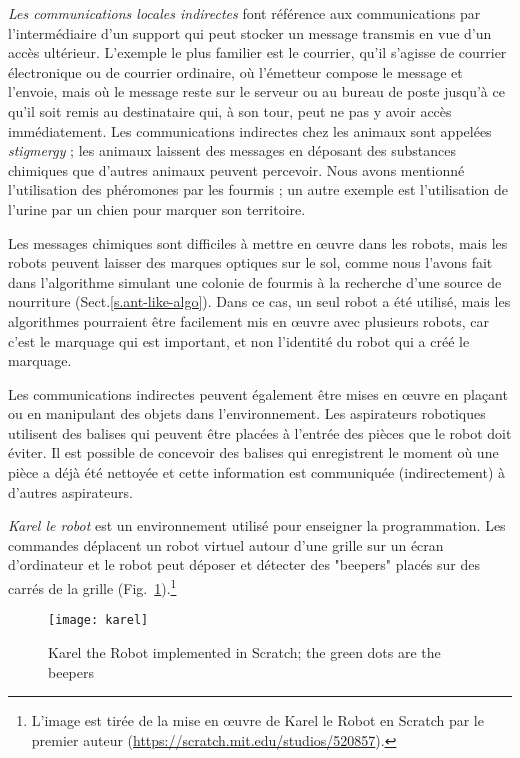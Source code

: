 \emph{Les communications locales indirectes} font référence aux communications par l'intermédiaire d'un support qui peut stocker un message transmis en vue d'un accès ultérieur. L'exemple le plus familier est le courrier, qu'il s'agisse de courrier électronique ou de courrier ordinaire, où l'émetteur compose le message et l'envoie, mais où le message reste sur le serveur ou au bureau de poste jusqu'à ce qu'il soit remis au destinataire qui, à son tour, peut ne pas y avoir accès immédiatement. Les communications indirectes chez les animaux sont appelées \emph{stigmergy} ; les animaux laissent des messages en déposant des substances chimiques que d'autres animaux peuvent percevoir. Nous avons mentionné l'utilisation des phéromones par les fourmis ; un autre exemple est l'utilisation de l'urine par un chien pour marquer son territoire.

Les messages chimiques sont difficiles à mettre en œuvre dans les robots, mais les robots peuvent laisser des marques optiques sur le sol, comme nous l'avons fait dans l'algorithme simulant une colonie de fourmis à la recherche d'une source de nourriture (Sect.\ref{s.ant-like-algo}). Dans ce cas, un seul robot a été utilisé, mais les algorithmes pourraient être facilement mis en œuvre avec plusieurs robots, car c'est le marquage qui est important, et non l'identité du robot qui a créé le marquage.

Les communications indirectes peuvent également être mises en œuvre en plaçant ou en manipulant des objets dans l'environnement. Les aspirateurs robotiques utilisent des balises qui peuvent être placées à l'entrée des pièces que le robot doit éviter. Il est possible de concevoir des balises qui enregistrent le moment où une pièce a déjà été nettoyée et cette information est communiquée (indirectement) à d'autres aspirateurs.

\emph{Karel le robot} est un environnement utilisé pour enseigner la programmation. Les commandes déplacent un robot virtuel autour d'une grille sur un écran d'ordinateur et le robot peut déposer et détecter des "beepers" placés sur des carrés de la grille (Fig.~\ref{fig.karel}).\footnote{L'image est tirée de la mise en œuvre de Karel le Robot en Scratch par le premier auteur (\url{https://scratch.mit.edu/studios/520857}).}

\begin{figure}
\begin{center}
\texttt{[image: karel]}
\end{center}
\caption{Karel the Robot implemented in Scratch; the green dots are the beepers}\label{fig.karel}
\end{figure}

